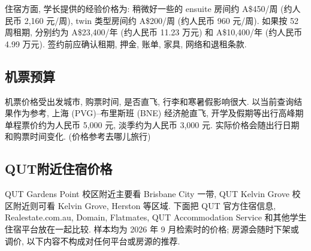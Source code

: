 \documentclass{jit-qut}
\begin{document}
住宿方面, 学长提供的经验价格为: 稍微好一些的 ensuite 房间约 A\$450/周 (约人民币 2,160 元/周), twin 类型房间约 A\$200/周 (约人民币 960 元/周). 如果按 52 周租期, 分别约为 A\$23,400/年 (约人民币 11.23 万元) 和 A\$10,400/年 (约人民币 4.99 万元). 签约前应确认租期, 押金, 账单, 家具, 网络和退租条款.

\subsection{机票预算}

机票价格受出发城市, 购票时间, 是否直飞, 行李和寒暑假影响很大. 以当前查询结果作为参考, 上海 (PVG)--布里斯班 (BNE) 经济舱直飞, 开学及假期等出行高峰期单程票价约为人民币 5,000 元, 淡季约为人民币 3,000 元. 实际价格会随出行日期和购票时间变化. (价格参考去哪儿旅行)

\subsection{QUT附近住宿价格}

QUT Gardens Point 校区附近主要看 Brisbane City 一带, QUT Kelvin Grove 校区附近则可看 Kelvin Grove, Herston 等区域. 下面把 QUT 官方住宿信息, Realestate.com.au, Domain, Flatmates, QUT Accommodation Service 和其他学生住宿平台放在一起比较. 样本均为 2026 年 9 月检索时的价格; 房源会随时下架或调价, 以下内容不构成对任何平台或房源的推荐.
\end{document}

